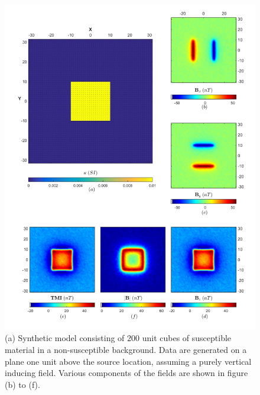\begin{figure}[h!]
\centering
\includegraphics[scale=0.55]{ES_Li_True}
\caption{(a) Synthetic model consisting of $200$ unit cubes of susceptible material in a non-susceptible background. Data are generated on a plane one unit above the source location, assuming a purely vertical inducing field. Various components of the fields are shown in figure (b) to (f). }
\label{fig:ES_Li_True}
\end{figure}

